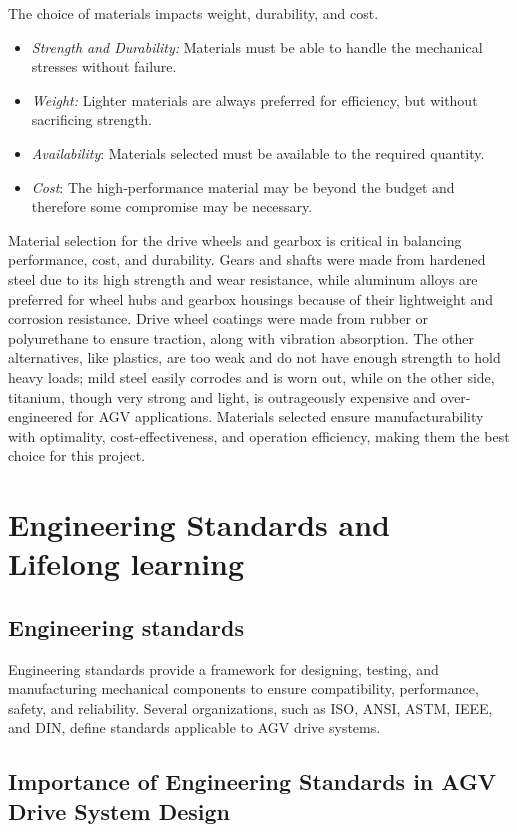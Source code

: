 \documentclass[../../main]{subfiles}
\begin{document}
The choice of materials impacts weight, durability, and cost.
\begin{itemize}
  \item 
  \textit{Strength and Durability:} Materials must be able to handle the
  mechanical stresses without failure.
  
  \item 
  \textit{Weight:} Lighter materials are always preferred for efficiency,
  but without sacrificing strength.
  
  \item 
  \textit{Availability}: Materials selected must be available to the
  required quantity.
  
  \item 
  \textit{Cost}: The high-performance material may be beyond the budget and
  therefore some compromise may be necessary.
\end{itemize}
Material selection for the drive wheels and gearbox is critical in balancing performance, cost, and durability. Gears and shafts were made from hardened steel due to its high strength and wear resistance, while aluminum alloys are preferred for wheel hubs and gearbox housings because of their lightweight and corrosion resistance. Drive wheel coatings were made from rubber or polyurethane to ensure traction, along with vibration absorption.
The other alternatives, like plastics, are too weak and do not have enough strength to hold heavy loads; mild steel easily corrodes and is worn out, while on the other side, titanium, though very strong and light, is outrageously expensive and over-engineered for AGV applications. Materials selected ensure manufacturability with optimality, cost-effectiveness, and operation efficiency, making them the best choice for this project.

\section{Engineering Standards and Lifelong learning}
\subsection{Engineering standards}
Engineering standards provide a framework for designing, testing,
and manufacturing mechanical components to ensure compatibility, 
performance, safety, and reliability. Several organizations, such as 
ISO, ANSI, ASTM, IEEE, and DIN, define standards applicable to AGV drive systems.

\subsection{Importance of Engineering Standards in AGV Drive System Design}
\end{document}
